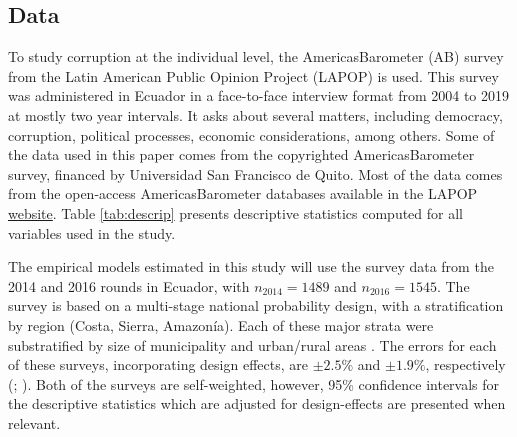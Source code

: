 \documentclass[12pt,a4]{article}\usepackage[]{graphicx}\usepackage[]{xcolor}
\begin{document}
\subsection{Data}

To study corruption at the individual level, the AmericasBarometer (AB) survey from the Latin American Public Opinion Project (LAPOP) is used. This survey was administered in Ecuador in a face-to-face interview format from 2004 to 2019 at mostly two year intervals. It asks about several matters, including democracy, corruption, political processes, economic considerations, among others. Some of the data used in this paper comes from the copyrighted \textregistered AmericasBarometer survey, financed by Universidad San Francisco de Quito. Most of the data comes from the open-access AmericasBarometer databases available in the LAPOP \href{https://www.vanderbilt.edu/lapop/data-access.php}{website}. Table \ref{tab:descrip} presents descriptive statistics computed for all variables used in the study.

The empirical models estimated in this study will use the survey data from the 2014 and 2016 rounds in Ecuador, with $n_{2014}=1489$ and $n_{2016}= 1545$. The survey is based on a multi-stage national probability design, with a stratification by region (Costa, Sierra, Amazonía). Each of these major strata were substratified by size of municipality and urban/rural areas \parencite{LAPOP.2017}. The errors for each of these surveys, incorporating design effects, are $\pm 2.5\%$ and $\pm 1.9\%$, respectively (\cite{LAPOP.2014}; \cite{LAPOP.2017}). Both of the surveys are self-weighted, however, 95\% confidence intervals for the descriptive statistics which are adjusted for design-effects are presented when relevant. 
\end{document}
